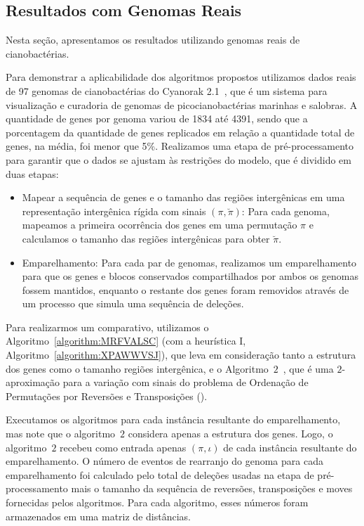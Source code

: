 \subsection{Resultados com Genomas Reais}

Nesta seção, apresentamos os resultados utilizando genomas reais de cianobactérias.

Para demonstrar a aplicabilidade dos algoritmos propostos utilizamos dados reais de 97 genomas de cianobactérias do Cyanorak 2.1~\cite{cyanorak}, que é um sistema para visualização e curadoria de genomas de picocianobactérias marinhas e salobras. A quantidade de genes por genoma variou de 1834 até 4391, sendo que a porcentagem da quantidade de genes replicados em relação a quantidade total de genes, na média, foi menor que 5\%. Realizamos uma etapa de pré-processamento para garantir que o dados se ajustam às restrições do modelo, que é dividido em duas etapas:
\begin{itemize}
  \item Mapear a sequência de genes e o tamanho das regiões intergênicas em uma representação intergênica rígida com sinais $(\pi,\breve\pi)$: Para cada genoma, mapeamos a primeira ocorrência dos genes em uma permutação $\pi$ e calculamos o tamanho das regiões intergênicas para obter $\breve\pi$.
  \item Emparelhamento: Para cada par de genomas, realizamos um emparelhamento para que os genes e blocos conservados compartilhados por ambos os genomas fossem mantidos, enquanto o restante dos genes foram removidos através de um processo que simula uma sequência de deleções.
\end{itemize}

Para realizarmos um comparativo, utilizamos o Algoritmo~\ref{algorithm:MRFVALSC} (com a heurística I, Algoritmo~\ref{algorithm:XPAWWVSJ}), que leva em consideração tanto a estrutura dos genes como o tamanho regiões intergênica, e o Algoritmo~$2$\SbRT{}~\cite{1998-walter-etal}, que é uma $2$-aproximação para a variação com sinais do problema de Ordenação de Permutações por Reversões e Transposições (\SbRT).

Executamos os algoritmos para cada instância resultante do emparelhamento, mas note que o algoritmo~$2$\SbRT{} considera apenas a estrutura dos genes. Logo, o algoritmo~$2$\SbRT{} recebeu como entrada apenas $(\pi,\iota)$ de cada instância resultante do emparelhamento. O número de eventos de rearranjo do genoma para cada emparelhamento foi calculado pelo total de deleções usadas na etapa de pré-processamento mais o tamanho da sequência de reversões, transposições e moves fornecidas pelos algoritmos. Para cada algoritmo, esses números foram armazenados em uma matriz de distâncias.

